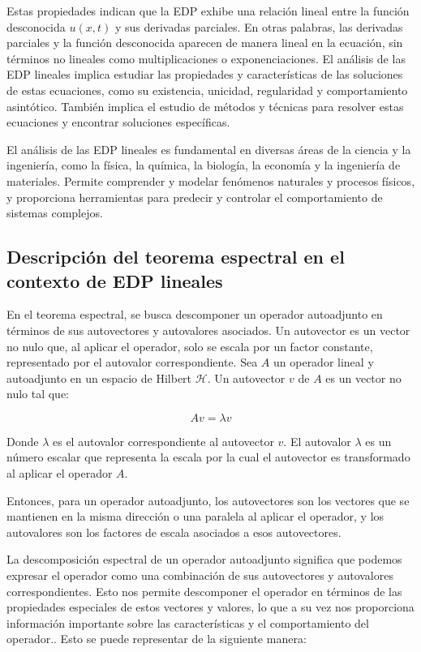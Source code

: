 \documentclass{article}
\begin{document}
    Estas propiedades indican que la EDP exhibe una relación lineal entre la función desconocida $u(x, t)$ y sus derivadas parciales. En otras palabras, las derivadas parciales y la función desconocida aparecen de manera lineal en la ecuación, sin términos no lineales como multiplicaciones o exponenciaciones.
    El análisis de las EDP lineales implica estudiar las propiedades y características de las soluciones de estas ecuaciones, como su existencia, unicidad, regularidad y comportamiento asintótico. También implica el estudio de métodos y técnicas para resolver estas ecuaciones y encontrar soluciones específicas.

    El análisis de las EDP lineales es fundamental en diversas áreas de la ciencia y la ingeniería, como la física, la química, la biología, la economía y la ingeniería de materiales. Permite comprender y modelar fenómenos naturales y procesos físicos, y proporciona herramientas para predecir y controlar el comportamiento de sistemas complejos.
    \subsection{Descripción del teorema espectral en el contexto de EDP lineales}

    En el teorema espectral, se busca descomponer un operador autoadjunto en términos de sus autovectores y autovalores asociados. Un autovector es un vector no nulo que, al aplicar el operador, solo se escala por un factor constante, representado por el autovalor correspondiente.
    Sea $A$ un operador lineal y autoadjunto en un espacio de Hilbert $\mathcal{H}$. Un autovector $v$ de $A$ es un vector no nulo tal que:

    \begin{equation}
    Av = \lambda v
    \end{equation}
    
    Donde $\lambda$ es el autovalor correspondiente al autovector $v$. El autovalor $\lambda$ es un número escalar que representa la escala por la cual el autovector es transformado al aplicar el operador $A$.
    
    Entonces, para un operador autoadjunto, los autovectores son los vectores que se mantienen en la misma dirección o una paralela al aplicar el operador, y los autovalores son los factores de escala asociados a esos autovectores.
    
    La descomposición espectral de un operador autoadjunto significa que podemos expresar el operador como una combinación de sus autovectores y autovalores correspondientes. Esto nos permite descomponer el operador en términos de las propiedades especiales de estos vectores y valores, lo que a su vez nos proporciona información importante sobre las características y el comportamiento del operador.. Esto se puede representar de la siguiente manera:
    
\end{document}
